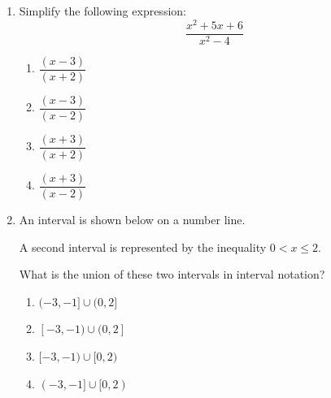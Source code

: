 \documentclass{article}
\begin{document}
\begin{enumerate}




    \item Simplify the following expression:
        \[  \frac{x^2+5x+6}{x^2-4}
        \]

                  \begin{multicols}{4}
                  \begin{enumerate}[label=\Alph*)]
                      \item $ \dfrac{(x-3)}{(x+2)}$
                      \item $ \dfrac{(x-3)}{(x-2)}$
                      \item $ \dfrac{(x+3)}{(x+2)}$
                      \item $ \dfrac{(x+3)}{(x-2)}$ %

                  \end{enumerate}
                  \end{multicols}



   \item An interval is shown below on a number line.
        \begin{center}
            \end{center}

        A second interval is represented by the inequality $0 < x \leq 2$. 

        What is the union of these two intervals in interval notation?

                  \begin{multicols}{4}
                  \begin{enumerate}[label=\Alph*)]
                      \item $(-3,-1] \cup (0,2] $
                      \item $[-3,-1) \cup (0,2] $ %
                      \item $[-3,-1) \cup [0,2) $ 
                      \item $(-3,-1] \cup [0,2) $
                  \end{enumerate}
                  \end{multicols}


\end{enumerate}
\end{document}
